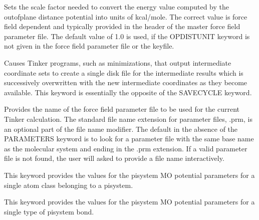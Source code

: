 \documentclass[letterpaper,11pt,english]{sphinxmanual}
\begin{document}
  Sets the scale factor needed to convert the energy value computed by the out\sphinxhyphen{}of\sphinxhyphen{}plane distance potential into units of kcal/mole. The correct value is force field dependent and typically provided in the header of the master force field parameter file. The default value of 1.0 is used, if the OPDISTUNIT keyword is not given in the force field parameter file or the keyfile.



  Causes Tinker programs, such as minimizations, that output intermediate coordinate sets to create a single disk file for the intermediate results which is successively overwritten with the new intermediate coordinates as they become available. This keyword is essentially the opposite of the SAVECYCLE keyword.

  Provides the name of the force field parameter file to be used for the current Tinker calculation. The standard file name extension for parameter files, .prm, is an optional part of the file name modifier. The default in the absence of the PARAMETERS keyword is to look for a parameter file with the same base name as the molecular system and ending in the .prm extension. If a valid parameter file is not found, the user will asked to provide a file name interactively.










  This keyword provides the values for the pisystem MO potential parameters for a single atom class belonging to a pisystem.

  This keyword provides the values for the pisystem MO potential parameters for a single type of pisystem bond.
\end{document}
